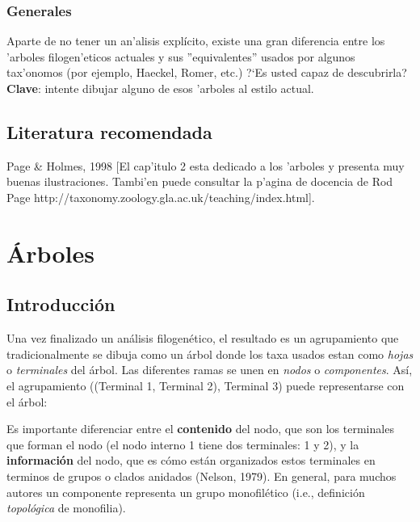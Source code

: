 \subsection{Generales}
\noindent
Aparte de no tener un an'alisis expl\'icito, existe una gran diferencia entre los 'arboles filogen'eticos actuales y sus ''equivalentes'' usados por algunos tax'onomos (por ejemplo, Haeckel, Romer, etc.) ?`Es usted capaz de descubrirla? \textbf{Clave}: intente dibujar alguno de esos 'arboles al estilo actual.
\section{Literatura recomendada}
\noindent
Page \& Holmes, 1998 [El cap'itulo 2 esta dedicado a los 'arboles y presenta muy buenas ilustraciones. Tambi'en puede consultar la p'agina de docencia de Rod Page http://taxonomy.zoology.gla.ac.uk/teaching/index.html].\chapter{\'Arboles}
\section*{Introducci\'on}

Una vez finalizado un an\'alisis filogen\'etico, el resultado es un agrupamiento que tradicionalmente se dibuja como un \'arbol donde los taxa usados estan como \emph{hojas} o \emph{terminales} del \'arbol. Las diferentes ramas se unen en \emph{nodos} o \emph{componentes}. As\'i, el agrupamiento ((Terminal 1, Terminal 2), Terminal 3) puede representarse con el \'arbol:

\begin{center}
%
%
\end{center}

Es importante diferenciar entre el \textbf{contenido} del nodo, que son los terminales que forman el nodo (el nodo interno 1 tiene dos terminales: 1 y 2), y la \textbf{informaci\'on} del nodo, que es c\'omo est\'an organizados estos terminales en terminos de grupos o clados anidados (Nelson, 1979). En general, para muchos autores un componente representa un grupo monofil\'etico (i.e., definici\'on \emph{topol\'ogica} de monofilia).


